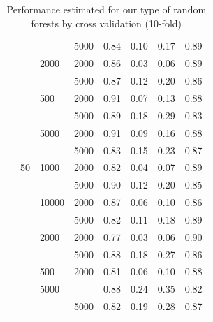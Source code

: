 \documentclass[a4paper,10pt]{article}
\begin{document}
\begin{table}[!ht]
\begin{footnotesize}
\begin{tabular}{llllrrrr}
     &    &      & 5000 &       0.84 &       0.10 &       0.17 &       0.89 \\
     &    & 2000 & 2000 &       0.86 &       0.03 &       0.06 &       0.89 \\
     &    &      & 5000 &       0.87 &       0.12 &       0.20 &       0.86 \\
     &    & 500 & 2000 &       0.91 &       0.07 &       0.13 &       0.88 \\
     &    &      & 5000 &       0.89 &       0.18 &       0.29 &       0.83 \\
     &    & 5000 & 2000 &       0.91 &       0.09 &       0.16 &       0.88 \\
     &    &      & 5000 &       0.83 &       0.15 &       0.23 &       0.87 \\
     & 50 & 1000 & 2000 &       0.82 &       0.04 &       0.07 &       0.89 \\
     &    &      & 5000 &       0.90 &       0.12 &       0.20 &       0.85 \\
     &    & 10000 & 2000 &       0.87 &       0.06 &       0.10 &       0.86 \\
     &    &      & 5000 &       0.82 &       0.11 &       0.18 &       0.89 \\
     &    & 2000 & 2000 &       0.77 &       0.03 &       0.06 &       0.90 \\
     &    &      & 5000 &       0.88 &       0.18 &       0.27 &       0.86 \\
     &    & 500 & 2000 &       0.81 &       0.06 &       0.10 &       0.88 \\
     &    & 5000 &      &       0.88 &       0.24 &       0.35 &       0.82 \\
     &    &      & 5000 &       0.82 &       0.19 &       0.28 &       0.87 \\
\bottomrule

\end{tabular}
\end{footnotesize}
\caption{Performance estimated for our type of random forests by cross validation (10-fold)}
\label{Cross_val: RF}
\end{table}

\newpage

\end{document}
